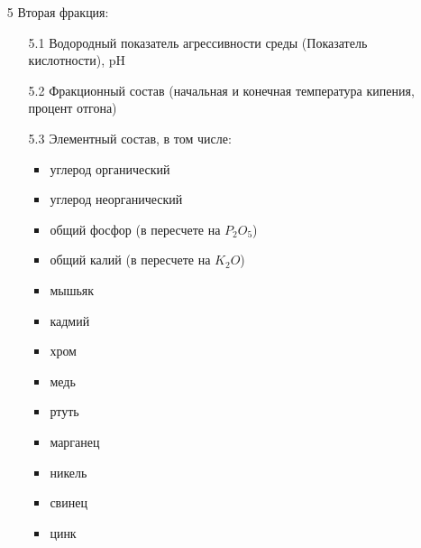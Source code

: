 \documentclass[russian,utf8]{eskdtext}
\begin{document}
\begin{enumerate}
  \item[5] Вторая фракция:
      \begin{enumerate}
      \item[5.1] Водородный показатель агрессивности среды (Показатель кислотности), pH
      \item[5.2] Фракционный состав (начальная и конечная температура кипения, процент отгона)
      \item[5.3] Элементный состав, в том числе:
         \begin{itemize}
         \item углерод органический
         \item углерод неорганический
         \item общий фосфор (в пересчете на  $P_{2}O_{5}$)
         \item общий калий (в пересчете на  $K_{2}O$)
         \item мышьяк  
         \item кадмий
         \item хром 
         \item медь 
         \item ртуть
         \item марганец 
         \item никель 
         \item свинец 
         \item цинк 
         \end{itemize}
      \end{enumerate}
   \end{enumerate} 
   
   
\end{document}
